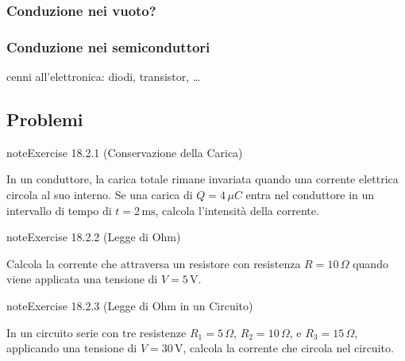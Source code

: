 \documentclass[letterpaper,10pt,italian]{jupyterBook}
\begin{document}
\subsubsection{Conduzione nei vuoto?}
\label{\detokenize{ch/electromagnetism/electric-current:conduzione-nei-vuoto}}

\subsubsection{Conduzione nei semiconduttori}
\label{\detokenize{ch/electromagnetism/electric-current:conduzione-nei-semiconduttori}}
\sphinxAtStartPar
cenni all’elettronica: diodi, transistor, …

\sphinxstepscope


\subsection{Problemi}
\label{\detokenize{ch/electromagnetism/electric-current-problems:problemi}}\label{\detokenize{ch/electromagnetism/electric-current-problems:physics-hs-electromagnetism-electric-current-problems}}\label{\detokenize{ch/electromagnetism/electric-current-problems::doc}} \label{exercise:ch/electromagnetism/electric-current-problems-exercise-0}

\begin{sphinxadmonition}{note}{Exercise 18.2.1 (Conservazione della Carica)}



\sphinxAtStartPar
In un conduttore, la carica totale rimane invariata quando una corrente elettrica circola al suo interno. Se una carica di \(Q = 4 \, \mu C\) entra nel conduttore in un intervallo di tempo di \(t = 2 \, \text{ms}\), calcola l’intensità della corrente.
\end{sphinxadmonition}
 \label{exercise:ch/electromagnetism/electric-current-problems-exercise-1}

\begin{sphinxadmonition}{note}{Exercise 18.2.2 (Legge di Ohm)}



\sphinxAtStartPar
Calcola la corrente che attraversa un resistore con resistenza \(R = 10 \, \Omega\) quando viene applicata una tensione di \(V = 5 \, \text{V}\).
\end{sphinxadmonition}
 \label{exercise:ch/electromagnetism/electric-current-problems-exercise-2}

\begin{sphinxadmonition}{note}{Exercise 18.2.3 (Legge di Ohm in un Circuito)}



\sphinxAtStartPar
In un circuito serie con tre resistenze \(R_1 = 5 \, \Omega\), \(R_2 = 10 \, \Omega\), e \(R_3 = 15 \, \Omega\), applicando una tensione di \(V = 30 \, \text{V}\), calcola la corrente che circola nel circuito.
\end{sphinxadmonition}
 \label{exercise:ch/electromagnetism/electric-current-problems-exercise-3}
\end{document}
